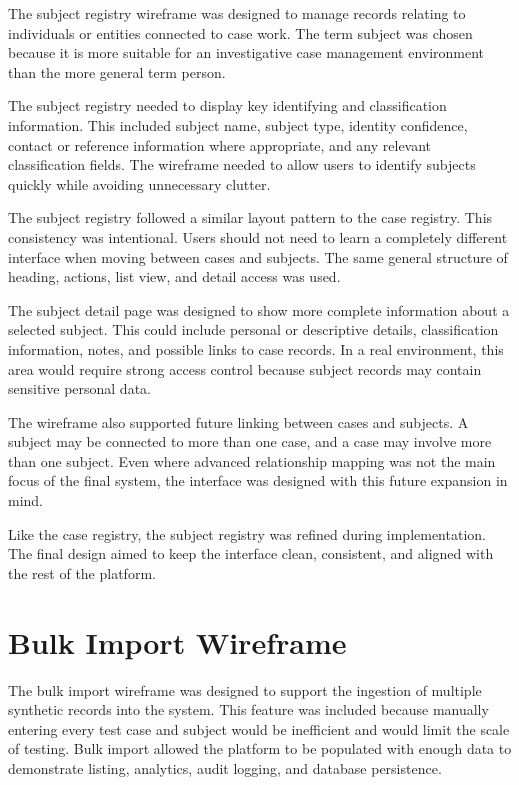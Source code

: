 The subject registry wireframe was designed to manage records relating to individuals or entities connected to case work. The term subject was chosen because it is more suitable for an investigative case management environment than the more general term person.

The subject registry needed to display key identifying and classification information. This included subject name, subject type, identity confidence, contact or reference information where appropriate, and any relevant classification fields. The wireframe needed to allow users to identify subjects quickly while avoiding unnecessary clutter.

The subject registry followed a similar layout pattern to the case registry. This consistency was intentional. Users should not need to learn a completely different interface when moving between cases and subjects. The same general structure of heading, actions, list view, and detail access was used.

The subject detail page was designed to show more complete information about a selected subject. This could include personal or descriptive details, classification information, notes, and possible links to case records. In a real environment, this area would require strong access control because subject records may contain sensitive personal data.

The wireframe also supported future linking between cases and subjects. A subject may be connected to more than one case, and a case may involve more than one subject. Even where advanced relationship mapping was not the main focus of the final system, the interface was designed with this future expansion in mind.

Like the case registry, the subject registry was refined during implementation. The final design aimed to keep the interface clean, consistent, and aligned with the rest of the platform.


\section{Bulk Import Wireframe}

The bulk import wireframe was designed to support the ingestion of multiple synthetic records into the system. This feature was included because manually entering every test case and subject would be inefficient and would limit the scale of testing. Bulk import allowed the platform to be populated with enough data to demonstrate listing, analytics, audit logging, and database persistence.


